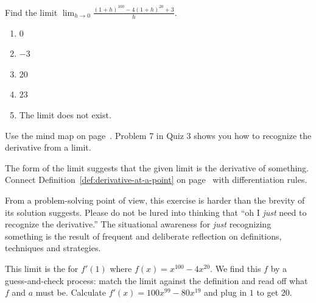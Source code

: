 \documentclass[../main.tex]{subfiles}
\begin{document}
\begin{exercise} \label{ex:midterm-exercise-6}
  Find the limit \(\lim_{h \to 0} \frac{(1 + h)^{100} - 4(1 + h)^{20} + 3}{h}\).
  \begin{enumerate}[label=\Alph*.]
    \item \(0\)
    \item \(-3\)
    \item \(20\)
    \item \(23\)
    \item The limit does not exist.
  \end{enumerate}

  \begin{hint}
    Use the mind map on page~\pageref{page:mindmap-limits-zero-over-zero}. Problem 7 in Quiz 3 shows you how to recognize the derivative from a limit.
  \end{hint}
  \begin{solution}
    The form of the limit suggests that the given limit is the derivative of something. Connect Definition~\ref{def:derivative-at-a-point} on page~\pageref{def:derivative-at-a-point} with differentiation rules.

    From a problem-solving point of view, this exercise is harder than the brevity of its solution suggests. Please do not be lured into thinking that ``oh I \emph{just} need to recognize the derivative.'' The situational awareness for \emph{just} recognizing something is the result of frequent and deliberate reflection on definitions, techniques and strategies.

    This limit is the  for \(f'(1)\) where \(f(x) = x^{100} - 4x^{20}\).  We find this \(f\) by a guess-and-check process: match the limit against the definition and read off what \(f\) and \(a\) must be. Calculate \(f'(x) = 100 x^{99} - 80 x^{19}\) and plug in \(1\) to get \(20\).
  \end{solution}
\end{exercise}
\nopagebreak\vfill
\end{document}
